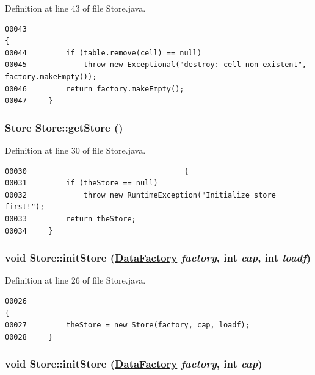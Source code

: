 Definition at line 43 of file Store.java.\footnotesize\begin{verbatim}00043                                                                     {
00044         if (table.remove(cell) == null)
00045             throw new Exceptional("destroy: cell non-existent", factory.makeEmpty());
00046         return factory.makeEmpty();
00047     }
\end{verbatim}\normalsize 
\hypertarget{classStore_d3}{
\subsubsection[getStore]{\setlength{\rightskip}{0pt plus 5cm}Store Store::get\-Store ()}}
\label{classStore_d3}




Definition at line 30 of file Store.java.\footnotesize\begin{verbatim}00030                                    {
00031         if (theStore == null)
00032             throw new RuntimeException("Initialize store first!");
00033         return theStore;
00034     }
\end{verbatim}\normalsize 
\hypertarget{classStore_d2}{
\subsubsection[initStore]{\setlength{\rightskip}{0pt plus 5cm}void Store::init\-Store (\hyperlink{interfaceDataFactory}{Data\-Factory} {\em factory}, int {\em cap}, int {\em loadf})}}
\label{classStore_d2}




Definition at line 26 of file Store.java.\footnotesize\begin{verbatim}00026                                                                           {
00027         theStore = new Store(factory, cap, loadf);
00028     }
\end{verbatim}\normalsize 
\hypertarget{classStore_d1}{
\subsubsection[initStore]{\setlength{\rightskip}{0pt plus 5cm}void Store::init\-Store (\hyperlink{interfaceDataFactory}{Data\-Factory} {\em factory}, int {\em cap})}}
\label{classStore_d1}




